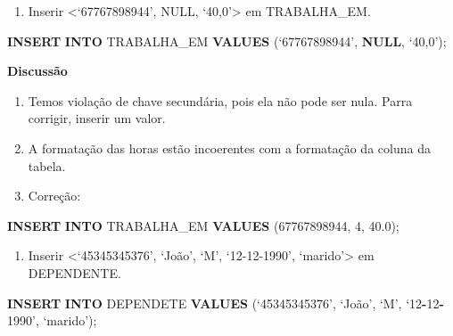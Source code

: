 \documentclass[
]{article}
\newenvironment{Shaded}{\begin{snugshade}}{\end{snugshade}}
\newcommand{\DecValTok}[1]{\textcolor[rgb]{0.00,0.00,0.81}{#1}}
\newcommand{\FloatTok}[1]{\textcolor[rgb]{0.00,0.00,0.81}{#1}}
\newcommand{\KeywordTok}[1]{\textcolor[rgb]{0.13,0.29,0.53}{\textbf{#1}}}
\newcommand{\NormalTok}[1]{#1}
\newcommand{\OperatorTok}[1]{\textcolor[rgb]{0.81,0.36,0.00}{\textbf{#1}}}
\newcommand{\StringTok}[1]{\textcolor[rgb]{0.31,0.60,0.02}{#1}}
\providecommand{\tightlist}{%
  \setlength{\itemsep}{0pt}\setlength{\parskip}{0pt}}
\begin{document}
\begin{enumerate}
\def\labelenumi{\arabic{enumi}.}
\setcounter{enumi}{3}
\tightlist
\item
  Inserir \textless{}`67767898944', NULL, `40,0'\textgreater{} em
  TRABALHA\_EM.
\end{enumerate}

\begin{Shaded}
\begin{Highlighting}[]
\KeywordTok{INSERT} \KeywordTok{INTO}\NormalTok{ TRABALHA\_EM }\KeywordTok{VALUES}\NormalTok{ (‘}\DecValTok{67767898944}\NormalTok{’, }\KeywordTok{NULL}\NormalTok{, ‘}\DecValTok{40}\NormalTok{,}\DecValTok{0}\NormalTok{’);}
\end{Highlighting}
\end{Shaded}

\textbf{Discussão}

\begin{enumerate}
\def\labelenumi{\roman{enumi}.}
\item
  Temos violação de chave secundária, pois ela não pode ser nula. Parra
  corrigir, inserir um valor.
\item
  A formatação das horas estão incoerentes com a formatação da coluna da
  tabela.
\item
  Correção:
\end{enumerate}

\begin{Shaded}
\begin{Highlighting}[]
\KeywordTok{INSERT} \KeywordTok{INTO}\NormalTok{ TRABALHA\_EM }\KeywordTok{VALUES}\NormalTok{ (}\StringTok{\textquotesingle{}67767898944\textquotesingle{}}\NormalTok{, }\DecValTok{4}\NormalTok{, }\FloatTok{40.0}\NormalTok{);}
\end{Highlighting}
\end{Shaded}

\begin{enumerate}
\def\labelenumi{\arabic{enumi}.}
\setcounter{enumi}{4}
\tightlist
\item
  Inserir \textless{}`45345345376', `João', `M', `12-12-1990',
  `marido'\textgreater{} em DEPENDENTE.
\end{enumerate}

\begin{Shaded}
\begin{Highlighting}[]
\KeywordTok{INSERT} \KeywordTok{INTO}\NormalTok{ DEPENDETE }\KeywordTok{VALUES}\NormalTok{ (‘}\DecValTok{45345345376}\NormalTok{’, ‘João’, ‘M’, ‘}\DecValTok{12}\OperatorTok{{-}}\DecValTok{12}\OperatorTok{{-}}\DecValTok{1990}\NormalTok{’, ‘marido’);}
\end{Highlighting}
\end{Shaded}
\end{document}
